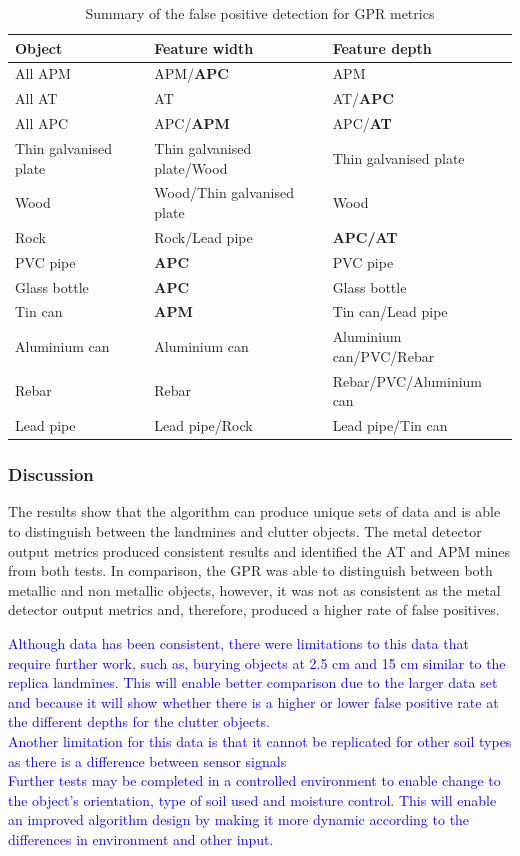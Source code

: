 \documentclass[main.tex]{subfiles}
\begin{document}
\begin{table}[!ht]
\centering
\caption{Summary of the false positive detection for GPR metrics}
\begin{tabular}{lll}
\toprule
Object & Feature width & Feature depth \\ \midrule
All APM & APM/\textbf{APC} & APM \\
All AT & AT & AT/\textbf{APC} \\
All APC & APC/\textbf{APM} & APC/\textbf{AT} \\
Thin galvanised plate & Thin galvanised plate/Wood & Thin galvanised plate \\
Wood & Wood/Thin galvanised plate & Wood \\
Rock & Rock/Lead pipe & \textbf{APC/AT} \\
PVC pipe & \textbf{APC} & PVC pipe \\
Glass bottle & \textbf{APC} & Glass bottle \\
Tin can & \textbf{APM} & Tin can/Lead pipe \\
Aluminium can & Aluminium can & Aluminium can/PVC/Rebar \\
Rebar & Rebar & Rebar/PVC/Aluminium can \\
Lead pipe & Lead pipe/Rock & Lead pipe/Tin can\\ \bottomrule
\end{tabular}
\end{table}

\subsubsection{Discussion}
The results show that the algorithm can produce unique sets of data and is able to distinguish between the landmines and clutter objects. The metal detector output metrics produced consistent results and identified the AT and APM mines from both tests. In comparison, the GPR was able to distinguish between both metallic and non metallic objects, however, it was not as consistent as the metal detector output metrics and, therefore, produced a higher rate of false positives. 

\textcolor{blue}{Although data has been consistent, there were limitations to this data that require further work, such as, burying objects at 2.5 cm and 15 cm similar to the replica landmines. This will enable better comparison due to the larger data set and because it will show whether there is a higher or lower false positive rate at the different depths for the clutter objects. \\
Another limitation for this data is that it cannot be replicated for other soil types as there is a difference between sensor signals  \\
Further tests may be completed in a controlled environment to enable change to the object's orientation, type of soil used and moisture control. This will enable an improved algorithm design by making it more dynamic according to the differences in environment and other input. 
}
\end{document}
